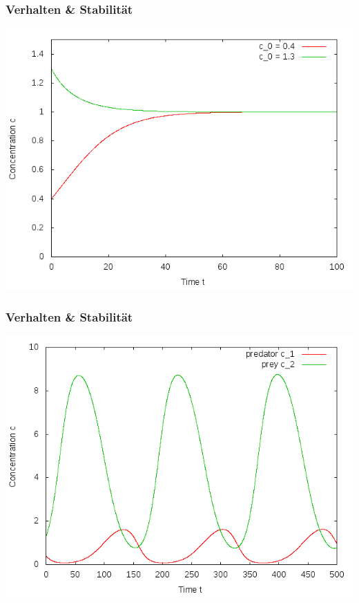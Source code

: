 \documentclass[12pt]{beamer}
\begin{document}
    \begin{frame}
    \frametitle{Verhalten \& Stabilität}
    \includegraphics[scale=0.5]{Bilder/n1_anfangsbedingungen.png}
    \end{frame}
    
    \begin{frame}
    \frametitle{Verhalten \& Stabilität}
    \includegraphics[scale=0.5]{Bilder/n2_unged_schwingungen.png}
    \end{frame}
    
\end{document}
